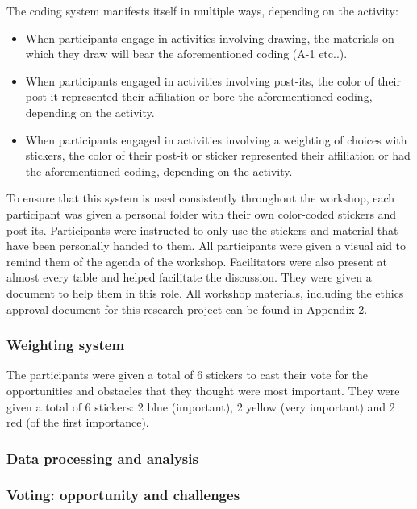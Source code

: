 The coding system manifests itself in multiple ways, depending on the activity:
\begin{itemize}
\item When participants engage in activities involving drawing, the materials on which they draw will bear the aforementioned coding (A-1 etc..).
\item When participants engaged in activities involving post-its, the color of their post-it represented their affiliation or bore the aforementioned coding, depending on the activity.
\item When participants engaged in activities involving a weighting of choices with stickers, the color of their post-it or sticker represented their affiliation or had the aforementioned coding, depending on the activity.
\end{itemize}

To ensure that this system is used consistently throughout the workshop, each participant was given a personal folder with their own color-coded stickers and post-its. Participants were instructed to only use the stickers and material that have been personally handed to them. All participants were given a visual aid to remind them of the agenda of the workshop. Facilitators were also present at almost every table and helped facilitate the discussion. They were given a document to help them in this role. All workshop materials, including the ethics approval document for this research project can be found in Appendix 2.\\

\subsubsection*{Weighting system}

 The participants were given a total of 6 stickers to cast their vote for the opportunities and obstacles that they thought were most important. They were given a total of 6 stickers: 2 blue (important), 2 yellow (very important) and 2 red (of the first importance).\\

\subsubsection{Data processing and analysis}

\subsubsection*{Voting: opportunity and challenges}

